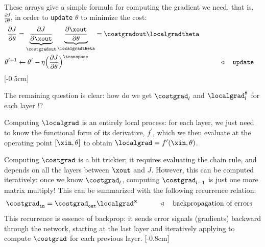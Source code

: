 These arrays give a simple formula for computing the gradient we need, that is, $\frac{\partial J}{\partial \theta}$, in order to \texttt{update} $\theta$ to minimize the cost:
\begin{align}
    \frac{\partial J}{\partial \theta} &= \underbrace{\frac{\partial J}{\partial \xout}}_{\costgradout} \underbrace{\frac{\partial \xout}{\partial \theta}}_{\localgradtheta} = \costgradout\localgradtheta\\
    \theta^{i+1} &\leftarrow \theta^{i} - \eta \Big(\frac{\partial J}{\partial \theta}\Big)^\transpose &&\quad\quad \triangleleft \quad \texttt{update} \label{eqn:backpropagation:djdtheta}
\end{align}
[-0.5cm]

The remaining question is clear: how do we get $\costgrad_l$ and $\localgrad^{\theta}_l$ for each layer $l$? 

Computing $\localgrad$ is an entirely local process: for each layer, we just need to know the functional form of its derivative, $f^{\prime}$, which we then evaluate at the operating point $[\xin, \theta]$ to obtain $\localgrad = f^{\prime}(\xin,\theta)$.

Computing $\costgrad$ is a bit trickier; it requires evaluating the chain rule, and depends on all the layers between $\xout$ and $J$. However, this can be computed iteratively: once we know $\costgrad_l$, computing $\costgrad_{l-1}$ is just one more matrix multiply! This can be summarized with the following recurrence relation:
\begin{align}
    \costgrad_{\texttt{in}} &= \costgrad_{\texttt{out}}\localgrad^{\mathbf{x}} &&\quad\quad \triangleleft \quad \text{backpropagation of errors}
    \label{eqn:backpropagation:backward}
\end{align}
This recurrence is essence of backprop: it sends error signals (gradients) backward through the network, starting at the last layer and iteratively applying \eqn{\ref{eqn:backpropagation:backward}} to
compute $\costgrad$ for each previous layer.
[-0.8cm]


